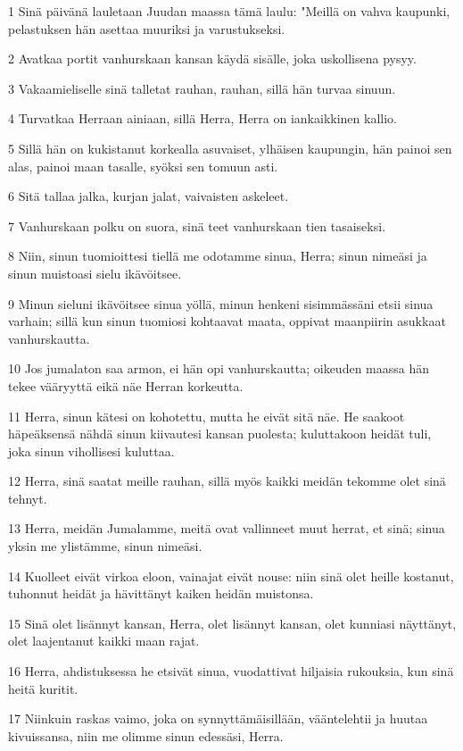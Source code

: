 \par 1 Sinä päivänä lauletaan Juudan maassa tämä laulu: "Meillä on vahva kaupunki, pelastuksen hän asettaa muuriksi ja varustukseksi.
\par 2 Avatkaa portit vanhurskaan kansan käydä sisälle, joka uskollisena pysyy.
\par 3 Vakaamieliselle sinä talletat rauhan, rauhan, sillä hän turvaa sinuun.
\par 4 Turvatkaa Herraan ainiaan, sillä Herra, Herra on iankaikkinen kallio.
\par 5 Sillä hän on kukistanut korkealla asuvaiset, ylhäisen kaupungin, hän painoi sen alas, painoi maan tasalle, syöksi sen tomuun asti.
\par 6 Sitä tallaa jalka, kurjan jalat, vaivaisten askeleet.
\par 7 Vanhurskaan polku on suora, sinä teet vanhurskaan tien tasaiseksi.
\par 8 Niin, sinun tuomioittesi tiellä me odotamme sinua, Herra; sinun nimeäsi ja sinun muistoasi sielu ikävöitsee.
\par 9 Minun sieluni ikävöitsee sinua yöllä, minun henkeni sisimmässäni etsii sinua varhain; sillä kun sinun tuomiosi kohtaavat maata, oppivat maanpiirin asukkaat vanhurskautta.
\par 10 Jos jumalaton saa armon, ei hän opi vanhurskautta; oikeuden maassa hän tekee vääryyttä eikä näe Herran korkeutta.
\par 11 Herra, sinun kätesi on kohotettu, mutta he eivät sitä näe. He saakoot häpeäksensä nähdä sinun kiivautesi kansan puolesta; kuluttakoon heidät tuli, joka sinun vihollisesi kuluttaa.
\par 12 Herra, sinä saatat meille rauhan, sillä myös kaikki meidän tekomme olet sinä tehnyt.
\par 13 Herra, meidän Jumalamme, meitä ovat vallinneet muut herrat, et sinä; sinua yksin me ylistämme, sinun nimeäsi.
\par 14 Kuolleet eivät virkoa eloon, vainajat eivät nouse: niin sinä olet heille kostanut, tuhonnut heidät ja hävittänyt kaiken heidän muistonsa.
\par 15 Sinä olet lisännyt kansan, Herra, olet lisännyt kansan, olet kunniasi näyttänyt, olet laajentanut kaikki maan rajat.
\par 16 Herra, ahdistuksessa he etsivät sinua, vuodattivat hiljaisia rukouksia, kun sinä heitä kuritit.
\par 17 Niinkuin raskas vaimo, joka on synnyttämäisillään, vääntelehtii ja huutaa kivuissansa, niin me olimme sinun edessäsi, Herra.
